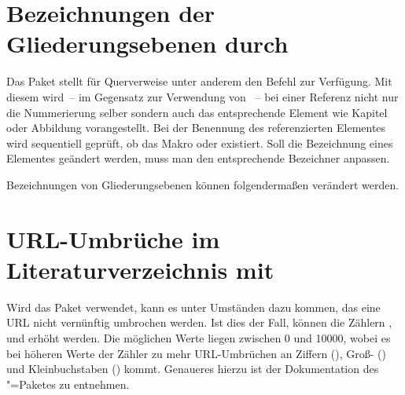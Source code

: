 \section{Bezeichnungen der Gliederungsebenen durch }
%
%
Das Paket  stellt für Querverweise unter anderem den Befehl 
 zur Verfügung. Mit diesem wird~-- im 
Gegensatz zur Verwendung von ~-- bei einer Referenz nicht nur die 
Nummerierung selber sondern auch das entsprechende Element wie Kapitel oder 
Abbildung vorangestellt. Bei der Benennung des referenzierten Elementes wird 
sequentiell geprüft, ob das Makro \Macro*{}
oder \Macro*{} existiert. Soll die Bezeichnung 
eines Elementes geändert werden, muss man den entsprechende Bezeichner anpassen.
%
\begin{Example}
Bezeichnungen von Gliederungsebenen können folgendermaßen verändert werden.
\begin{Code}
\end{Code}
\end{Example}



\section{URL-Umbrüche im Literaturverzeichnis mit }
%
%
Wird das Paket  verwendet, kann es unter Umständen dazu 
kommen, das eine URL nicht vernünftig umbrochen werden. Ist dies der Fall, 
können die Zählern ,  und 
 erhöht werden. Die möglichen Werte liegen zwischen 0 
und 10000, wobei es bei höheren Werte der Zähler zu mehr URL-Umbrüchen an 
Ziffern (), Groß- () und 
Kleinbuchstaben () kommt. Genaueres hierzu ist der 
Dokumentation des "=Paketes zu entnehmen.



